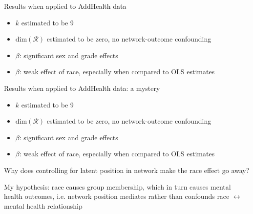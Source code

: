 \documentclass{beamer}
\theoremstyle{remark}
\begin{document}
\begin{frame}{Results when applied to AddHealth data}

    \begin{itemize}
        \item $k$ estimated to be 9
        \item $\mathrm{dim}(\mathcal R)$ estimated to be zero, no network-outcome confounding
        \item $\beta$: significant sex and grade effects
        \item $\beta$: weak effect of race, especially when compared to OLS estimates
    \end{itemize}

\end{frame}

\begin{frame}{Results when applied to AddHealth data: a mystery}

    \begin{itemize}
        \item $k$ estimated to be 9
        \item $\mathrm{dim}(\mathcal R)$ estimated to be zero, no network-outcome confounding
        \item $\beta$: significant sex and grade effects
        \item $\beta$: weak effect of race, especially when compared to OLS estimates
    \end{itemize}

    Why does controlling for latent position in network make the race effect go away?

    My hypothesis: race causes group membership, which in turn causes mental health outcomes, i.e. network position mediates rather than confounds race $\leftrightarrow$ mental health relationship

\end{frame}
\end{document}
